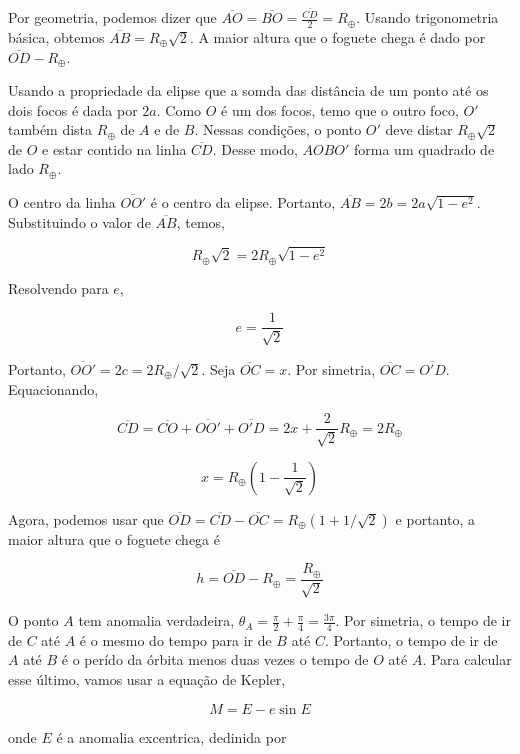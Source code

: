 \documentclass[11pt]{article}
\begin{document}
\begin{pproblem}
\begin{pssolution*}{}{}
\begin{alternativas}
            Por geometria, podemos dizer que \(\overline{AO} = \overline{BO} = \frac{\overline{CD}}{2} = R_\oplus\). Usando trigonometria básica, obtemos \(\overline{AB} = R_\oplus \sqrt 2\). A maior altura que o foguete chega é dado por \(\overline{OD}-R_\oplus\).

            Usando a propriedade da elipse que a somda das distância de um ponto até os dois focos é dada por \(2a\). Como \(O\) é um dos focos, temo que o outro foco, \(O'\) também dista \(R_\oplus\) de \(A\) e de \(B\). Nessas condições, o ponto \(O'\) deve distar \(R_\oplus\sqrt 2\) de \(O\) e estar contido na linha \(\overline{CD}\). Desse modo, \(AOBO'\) forma um quadrado de lado \(R_\oplus\).

            O centro da linha \(\overline{OO'}\) é o centro da elipse. Portanto, \(\overline{AB} = 2b = 2a\sqrt{1-e^2}\). Substituindo o valor de \(\overline{AB}\), temos, 
            
            \[R_\oplus\sqrt 2 = 2 R_\oplus \sqrt{1-e^2}\]

            Resolvendo para \(e\), 

            \[e = \frac{1}{\sqrt{2}}\]

            Portanto, \(\overline{OO'} = 2c = 2R_\oplus/\sqrt2\). Seja \(\overline{OC} = x\). Por simetria, \(\overline{OC} = \overline{O'D}\). Equacionando, 

            \[\overline{CD} = \overline{CO}+\overline{OO'}+\overline{O'D} = 2x + \frac{2}{\sqrt2}R_\oplus = 2R_\oplus\]

            \[x = R_\oplus\left(1 - \frac{1}{\sqrt2}\right)\]

            Agora, podemos usar que \(\overline{OD} = \overline{CD} - \overline{OC} = R_\oplus\left(1+1/\sqrt2\right)\) e portanto, a maior altura que o foguete chega é 

            \[\boxed{h = \overline{OD}-R_\oplus = \frac{R_\oplus}{\sqrt2}}\]

            \item O ponto \(A\) tem anomalia verdadeira, \(\theta_A = \frac{\pi}{2}+\frac{\pi}{4} = \frac{3\pi}{4}\). Por simetria, o tempo de ir de \(C\) até \(A\) é o mesmo do tempo para ir de \(B\) até \(C\). Portanto, o tempo de ir de \(A\) até \(B\) é o perído da órbita menos duas vezes o tempo de \(O\) até \(A\). Para calcular esse último, vamos usar a equação de Kepler, 
            
            \[M = E - e\sin E\]

            onde \(E\) é a anomalia excentrica, dedinida por 


\end{alternativas}
\end{pssolution*}
\end{pproblem}
\end{document}
